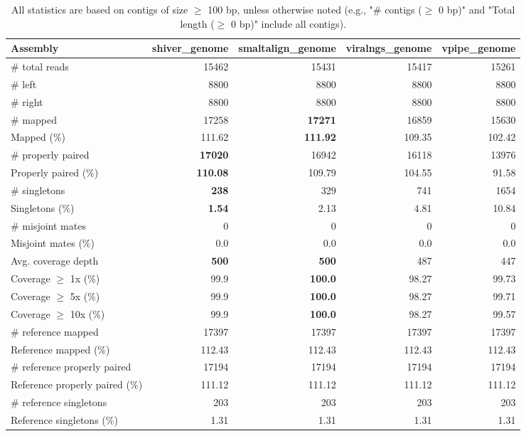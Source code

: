 \documentclass[12pt,a4paper]{article}
\begin{document}
\begin{table}[ht]
\begin{center}
\caption{All statistics are based on contigs of size $\geq$ 100 bp, unless otherwise noted (e.g., "\# contigs ($\geq$ 0 bp)" and "Total length ($\geq$ 0 bp)" include all contigs).}
\begin{tabular}{|l*{4}{|r}|}
\hline
Assembly & shiver\_genome & smaltalign\_genome & viralngs\_genome & vpipe\_genome \\ \hline
\# total reads & 15462 & 15431 & 15417 & 15261 \\ \hline
\# left & 8800 & 8800 & 8800 & 8800 \\ \hline
\# right & 8800 & 8800 & 8800 & 8800 \\ \hline
\# mapped & 17258 & {\bf 17271} & 16859 & 15630 \\ \hline
Mapped (\%) & 111.62 & {\bf 111.92} & 109.35 & 102.42 \\ \hline
\# properly paired & {\bf 17020} & 16942 & 16118 & 13976 \\ \hline
Properly paired (\%) & {\bf 110.08} & 109.79 & 104.55 & 91.58 \\ \hline
\# singletons & {\bf 238} & 329 & 741 & 1654 \\ \hline
Singletons (\%) & {\bf 1.54} & 2.13 & 4.81 & 10.84 \\ \hline
\# misjoint mates & 0 & 0 & 0 & 0 \\ \hline
Misjoint mates (\%) & 0.0 & 0.0 & 0.0 & 0.0 \\ \hline
Avg. coverage depth & {\bf 500} & {\bf 500} & 487 & 447 \\ \hline
Coverage $\geq$ 1x (\%) & 99.9 & {\bf 100.0} & 98.27 & 99.73 \\ \hline
Coverage $\geq$ 5x (\%) & 99.9 & {\bf 100.0} & 98.27 & 99.71 \\ \hline
Coverage $\geq$ 10x (\%) & 99.9 & {\bf 100.0} & 98.27 & 99.57 \\ \hline
\# reference mapped & 17397 & 17397 & 17397 & 17397 \\ \hline
Reference mapped (\%) & 112.43 & 112.43 & 112.43 & 112.43 \\ \hline
\# reference properly paired & 17194 & 17194 & 17194 & 17194 \\ \hline
Reference properly paired (\%) & 111.12 & 111.12 & 111.12 & 111.12 \\ \hline
\# reference singletons & 203 & 203 & 203 & 203 \\ \hline
Reference singletons (\%) & 1.31 & 1.31 & 1.31 & 1.31 \\ \hline

\end{tabular}
\end{center}
\end{table}
\end{document}

